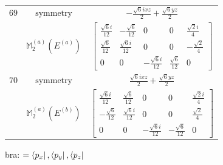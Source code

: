 \documentclass[fleqn,8pt,landscape]{jsarticle}
\begin{document}
\begin{longtable}{ccc}
$ 69 $ & $ \text{symmetry} $ & $ - \frac{\sqrt{6} i x z}{2} + \frac{\sqrt{6} y z}{2} $ \\
$  $ & $ \mathbb{M}_{2}^{(a)}(E^{(a)}) $ & $ \begin{bmatrix} \frac{\sqrt{6} i}{12} & - \frac{\sqrt{6}}{12} & 0 & 0 & \frac{\sqrt{2} i}{4} \\ \frac{\sqrt{6}}{12} & \frac{\sqrt{6} i}{12} & 0 & 0 & - \frac{\sqrt{2}}{4} \\ 0 & 0 & - \frac{\sqrt{6} i}{12} & \frac{\sqrt{6}}{12} & 0 \end{bmatrix} $ \\ \hline
$ 70 $ & $ \text{symmetry} $ & $ \frac{\sqrt{6} i x z}{2} + \frac{\sqrt{6} y z}{2} $ \\
$  $ & $ \mathbb{M}_{2}^{(a)}(E^{(b)}) $ & $ \begin{bmatrix} \frac{\sqrt{6} i}{12} & \frac{\sqrt{6}}{12} & 0 & 0 & \frac{\sqrt{2} i}{4} \\ - \frac{\sqrt{6}}{12} & \frac{\sqrt{6} i}{12} & 0 & 0 & \frac{\sqrt{2}}{4} \\ 0 & 0 & - \frac{\sqrt{6} i}{12} & - \frac{\sqrt{6}}{12} & 0 \end{bmatrix} $ \\ \hline
\end{longtable}
bra: $=\bra{p_{x}}, \bra{p_{y}}, \bra{p_{z}}$
\end{document}
